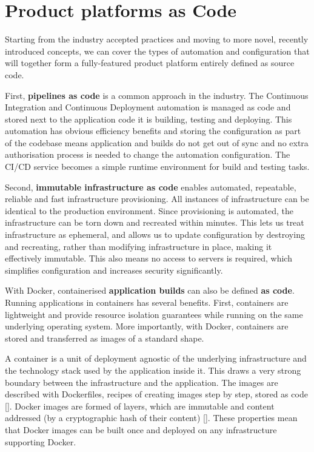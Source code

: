 \documentclass[reprint,amsmath,amssymb,aps]{revtex4-1}
\begin{document}
\section{Product platforms as Code}
\label{sec:ascode}

Starting from the industry accepted practices and moving to more novel, recently introduced concepts, we can cover the types of automation and configuration that will together form a fully-featured product platform entirely defined as source code.

First, \textbf{pipelines as code} is a common approach in the industry. The Continuous Integration and Continuous Deployment automation is managed as code and stored next to the application code it is building, testing and deploying. This automation has obvious efficiency benefits and storing the configuration as part of the codebase means application and builds do not get out of sync and no extra authorisation process is needed to change the automation configuration. The CI/CD service becomes a simple runtime environment for build and testing tasks.

Second, \textbf{immutable infrastructure as code} enables automated, repeatable, reliable and fast infrastructure provisioning. All instances of infrastructure can be identical to the production environment. Since provisioning is automated, the infrastructure can be torn down and recreated within minutes. This lets us treat infrastructure as ephemeral, and allows us to update configuration by destroying and recreating, rather than modifying infrastructure in place, making it effectively immutable. This also means no access to servers is required, which simplifies configuration and increases security significantly.

With Docker, containerised \textbf{application builds} can also be defined \textbf{as code}. Running applications in containers has several benefits. First, containers are lightweight and provide resource isolation guarantees while running on the same underlying operating system. More importantly, with Docker, containers are stored and transferred as images of a standard shape.

A container is a unit of deployment agnostic of the underlying infrastructure and the technology stack used by the application inside it. This draws a very strong boundary between the infrastructure and the application. The images are described with Dockerfiles, recipes of creating images step by step, stored as code []. Docker images are formed of layers, which are immutable and content addressed (by a cryptographic hash of their content) []. These properties mean that Docker images can be built once and deployed on any infrastructure supporting Docker.
\end{document}
